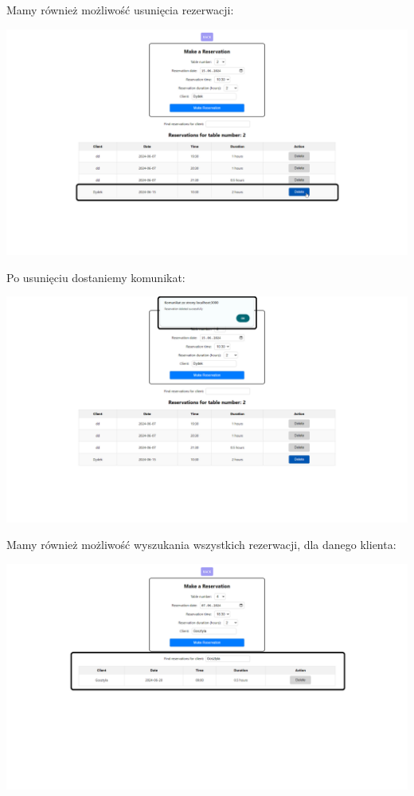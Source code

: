 \documentclass[12pt]{article}
\begin{document}
\begin{minipage}{\textwidth}
\noindent Mamy również możliwość usunięcia rezerwacji:
\begin{center}
\includegraphics[width=\textwidth]{media/Reservation_delete.png}
\end{center}
\end{minipage}

\begin{minipage}{\textwidth}
\noindent Po usunięciu dostaniemy komunikat:
\begin{center}
\includegraphics[width=\textwidth]{media/Reservations_delete_successfull.png}
\end{center}
\end{minipage}

\begin{minipage}{\textwidth}
\noindent Mamy również możliwość wyszukania wszystkich rezerwacji, dla danego klienta:
\begin{center}
\includegraphics[width=\textwidth]{media/Reservations_searchClient.png}
\end{center}
\end{minipage}
\end{document}
